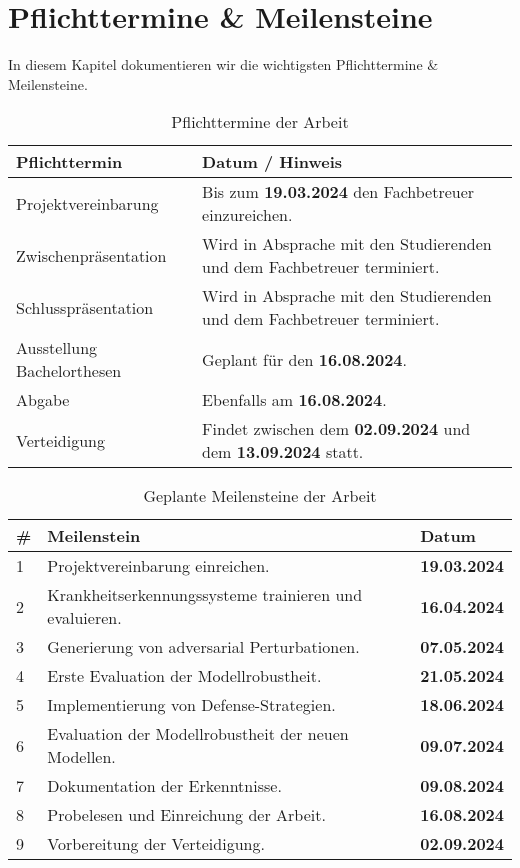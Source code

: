 \section{Pflichttermine \& Meilensteine}
In diesem Kapitel dokumentieren wir die wichtigsten Pflichttermine \& Meilensteine.
\begin{table}[ht]
    \centering
    \begin{tabular}{@{}p{5cm}p{10cm}@{}}
        \toprule
        \textbf{Pflichttermin} & \textbf{Datum / Hinweis} \\
        \midrule
        Projektvereinbarung & Bis zum \textbf{19.03.2024} den Fachbetreuer einzureichen. \\
        \midrule
        Zwischenpräsentation & Wird in Absprache mit den Studierenden und dem Fachbetreuer terminiert. \\
        \midrule
        Schlusspräsentation & Wird in Absprache mit den Studierenden und dem Fachbetreuer terminiert. \\
        \midrule
        Ausstellung Bachelorthesen & Geplant für den \textbf{16.08.2024}. \\
        \midrule
        Abgabe & Ebenfalls am \textbf{16.08.2024}. \\
        \midrule
        Verteidigung & Findet zwischen dem \textbf{02.09.2024} und dem \textbf{13.09.2024} statt. \\
        \bottomrule
    \end{tabular}
    \caption{Pflichttermine der Arbeit}
\end{table}

\begin{table}[ht]
    \centering
    \begin{tabular}{@{}p{0.5cm}p{10cm}p{2.5cm}@{}}
        \toprule
        \textbf{\#} & \textbf{Meilenstein} & \textbf{Datum} \\
        \midrule
        1 & Projektvereinbarung einreichen. & \textbf{19.03.2024} \\
        \midrule
        2 & Krankheitserkennungssysteme trainieren und evaluieren. & \textbf{16.04.2024} \\
        \midrule
        3 & Generierung von adversarial Perturbationen. & \textbf{07.05.2024}\\
        \midrule
        4 & Erste Evaluation der Modellrobustheit. & \textbf{21.05.2024} \\
        \midrule
        5 & Implementierung von Defense-Strategien. & \textbf{18.06.2024} \\
        \midrule
        6 & Evaluation der Modellrobustheit der neuen Modellen. & \textbf{09.07.2024} \\
        \midrule
        7 & Dokumentation der Erkenntnisse. & \textbf{09.08.2024} \\
        \midrule
        8 & Probelesen und Einreichung der Arbeit. & \textbf{16.08.2024} \\
        \midrule
        9 & Vorbereitung der Verteidigung. & \textbf{02.09.2024} \\
        \bottomrule
    \end{tabular}
    \caption{Geplante Meilensteine der Arbeit}
\end{table}
